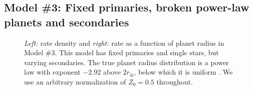 \documentclass[12pt,modern]{aastex61}
\begin{document}

\subsection{Model \#3: Fixed primaries, broken power-law planets and 
secondaries}
\label{sec:model_3}

\begin{figure}[!tb]
    \centering
    \caption{
        {\it Left:} rate density and {\it right:} rate as a 
        function of planet radius in Model \#3. This model has fixed primaries 
        and 
        single stars, but varying secondaries. The true planet radius 
        distribution is 
        a power law with exponent $-2.92$ above $2r_\oplus$, below which it is 
        uniform 
        \citep[similar to][]{howard_planet_2012}. We use an arbitrary 
        normalization of 
        $Z_0=0.5$ throughout.}
    \label{fig:occ_rate_model_3_log}
\end{figure}
\end{document}

